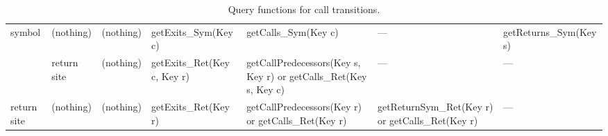 \begin{sidewaystable}
\begin{tabular}{x{0.6in}x{0.6in}x{0.6in}|x{1.9in}x{1.9in}x{1.9in}x{2in}}
 symbol         &  (nothing)        &  (nothing)    & getExits\_Sym(Key c)              &  getCalls\_Sym(Key c)                &   ---                                      &  getReturns\_Sym(Key s)                 \tabularnewline
                &  return site      &  (nothing)    & getExits\_Ret(Key c, Key r)     &  getCallPredecessors(Key s, Key r) \newline
                                                                                              or getCalls\_Ret(Key s, Key c)    &   ---                                      &   ---                                     \tabularnewline
\midrule %
 return site    &  (nothing)         & (nothing)    & getExits\_Ret(Key r)               &  getCallPredecessors(Key r) \newline
                                                                                              or getCalls\_Ret(Key r)              &  getReturnSym\_Ret(Key r) or \newline
                                                                                                                                        getCalls\_Ret(Key r)                    &   ---                                     \tabularnewline
\bottomrule\bottomrule
\end{tabular}
\caption{Query functions for call transitions.}
\end{sidewaystable}
\restoregeometry
